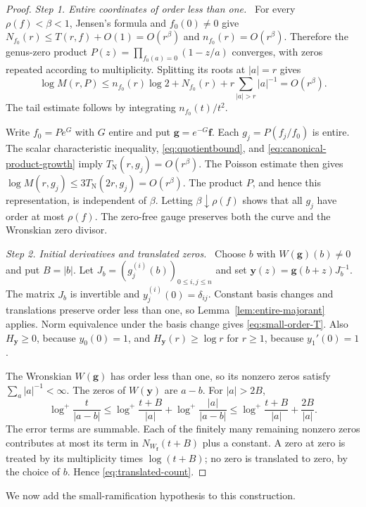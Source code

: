 \documentclass[11pt,letterpaper,reqno]{amsart}
\theoremstyle{remark}
\numberwithin{equation}{section}
\newcommand{\TN}{T_{\mathrm N}}
\newcommand{\fv}{\bm f}
\newcommand{\gv}{\bm g}
\newcommand{\yv}{\bm y}
\newcommand{\step}[1]{\medskip\noindent\emph{#1}\ }
\begin{document}
\begin{proof}
\step{Step 1. Entire coordinates of order less than one.}
For every $\rho(f)<\beta<1$, Jensen's formula and $f_0(0)\ne0$ give
$N_{f_0}(r)\le T(r,f)+O(1)=O(r^\beta)$ and
$n_{f_0}(r)=O(r^\beta)$. Therefore the genus-zero product
$P(z)=\prod_{f_0(a)=0}(1-z/a)$ converges, with zeros repeated according to
multiplicity. Splitting its roots at $|a|=r$ gives
\begin{equation}\label{eq:canonical-product-growth}
 \log M(r,P)\le n_{f_0}(r)\log2+N_{f_0}(r)
                     +r\sum_{|a|>r}|a|^{-1}=O(r^\beta).
\end{equation}
The tail estimate follows by integrating $n_{f_0}(t)/t^2$.

Write $f_0=Pe^G$ with $G$ entire and put $\gv=e^{-G}\fv$.
Each $g_j=P(f_j/f_0)$ is entire. The scalar characteristic inequality,
\eqref{eq:quotientbound}, and \eqref{eq:canonical-product-growth} imply
$\TN(r,g_j)=O(r^\beta)$. The Poisson estimate then gives
$\log M(r,g_j)\le3\TN(2r,g_j)=O(r^\beta)$.
The product $P$, and hence this representation, is independent of $\beta$.
Letting $\beta\downarrow\rho(f)$ shows that all $g_j$ have order at most
$\rho(f)$. The zero-free gauge preserves both the curve and the Wronskian
zero divisor.

\step{Step 2. Initial derivatives and translated zeros.}
Choose $b$ with $W(\gv)(b)\ne0$ and put $B=|b|$. Let
$J_b=(g_j^{(i)}(b))_{0\leq i,j\leq n}$ and set
$\yv(z)=\gv(b+z)J_b^{-1}$. The matrix $J_b$ is invertible and
$y_j^{(i)}(0)=\delta_{ij}$. Constant basis changes and translations preserve
order less than one, so Lemma~\ref{lem:entire-majorant} applies. Norm
equivalence under the basis change gives
\eqref{eq:small-order-T}.
Also $H_{\yv}\ge0$, because $y_0(0)=1$, and
$H_{\yv}(r)\ge\log r$ for $r\ge1$, because $y_1'(0)=1$.

The Wronskian $W(\gv)$ has order less than one, so its nonzero zeros
satisfy $\sum_a|a|^{-1}<\infty$. The zeros of $W(\yv)$ are $a-b$.
For $|a|>2B$,
\[
 \log^+\frac t{|a-b|}
 \le\log^+\frac{t+B}{|a|}+\log^+\frac{|a|}{|a-b|}
 \le\log^+\frac{t+B}{|a|}+\frac{2B}{|a|}.
\]
The error terms are summable. Each of the finitely many remaining nonzero
zeros contributes at most its term in $N_{W_{\fv}}(t+B)$ plus a constant.
A zero at zero is treated by its multiplicity times $\log(t+B)$; no zero
is translated to zero, by the choice of $b$. Hence
\eqref{eq:translated-count}.
\end{proof}

We now add the small-ramification hypothesis to this construction.
\end{document}
